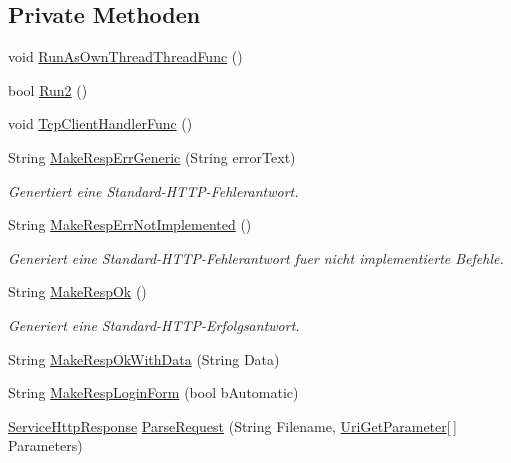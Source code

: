 \subsection*{Private Methoden}
\begin{CompactItemize}
\item 
void \hyperlink{classQbeSAS_1_1HttpService_QbeSAS_1_1HttpServiced0}{Run\-As\-Own\-Thread\-Thread\-Func} ()
\item 
bool \hyperlink{classQbeSAS_1_1HttpService_QbeSAS_1_1HttpServiced1}{Run2} ()
\item 
void \hyperlink{classQbeSAS_1_1HttpService_QbeSAS_1_1HttpServiced2}{Tcp\-Client\-Handler\-Func} ()
\item 
String \hyperlink{classQbeSAS_1_1HttpService_QbeSAS_1_1HttpServiced3}{Make\-Resp\-Err\-Generic} (String error\-Text)
\begin{CompactList}\small\item\em Genertiert eine Standard-HTTP-Fehlerantwort. \item\end{CompactList}\item 
String \hyperlink{classQbeSAS_1_1HttpService_QbeSAS_1_1HttpServiced4}{Make\-Resp\-Err\-Not\-Implemented} ()
\begin{CompactList}\small\item\em Generiert eine Standard-HTTP-Fehlerantwort fuer nicht implementierte Befehle. \item\end{CompactList}\item 
String \hyperlink{classQbeSAS_1_1HttpService_QbeSAS_1_1HttpServiced5}{Make\-Resp\-Ok} ()
\begin{CompactList}\small\item\em Generiert eine Standard-HTTP-Erfolgsantwort. \item\end{CompactList}\item 
String \hyperlink{classQbeSAS_1_1HttpService_QbeSAS_1_1HttpServiced6}{Make\-Resp\-Ok\-With\-Data} (String Data)
\item 
String \hyperlink{classQbeSAS_1_1HttpService_QbeSAS_1_1HttpServiced7}{Make\-Resp\-Login\-Form} (bool b\-Automatic)
\item 
\hyperlink{classQbeSAS_1_1HttpService_1_1ServiceHttpResponse}{Service\-Http\-Response} \hyperlink{classQbeSAS_1_1HttpService_QbeSAS_1_1HttpServiced8}{Parse\-Request} (String Filename, \hyperlink{classQbeSAS_1_1HttpService_1_1UriGetParameter}{Uri\-Get\-Parameter}\mbox{[}$\,$\mbox{]} Parameters)

\end{CompactItemize}
